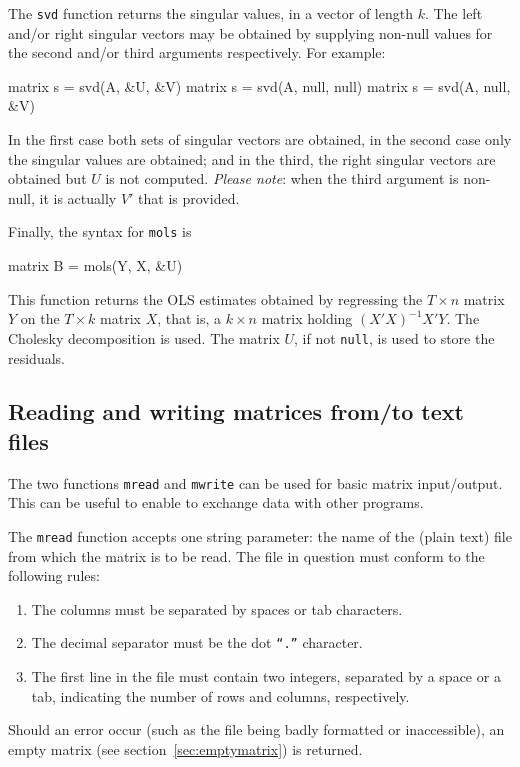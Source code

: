 The \texttt{svd} function returns the singular values, in a vector of
length $k$.  The left and/or right singular vectors may be obtained by
supplying non-null values for the second and/or third arguments
respectively.  For example:
%
\begin{code}
matrix s = svd(A, &U, &V)
matrix s = svd(A, null, null)
matrix s = svd(A, null, &V)
\end{code}
%
In the first case both sets of singular vectors are obtained, in the
second case only the singular values are obtained; and in the third,
the right singular vectors are obtained but $U$ is not computed.
\emph{Please note}: when the third argument is non-null, it is
actually $V'$ that is provided.

Finally, the syntax for \texttt{mols} is
%
\begin{code}
matrix B = mols(Y, X, &U)
\end{code}
%
This function returns the OLS estimates obtained by regressing the $T
\times n$ matrix $Y$ on the $T \times k$ matrix $X$, that is, a $k
\times n$ matrix holding $(X'X)^{-1} X'Y$. The Cholesky decomposition
is used. The matrix $U$, if not \texttt{null}, is used to store the
residuals.

\subsection{Reading and writing matrices from/to text files}
\label{matrix-csv}

The two functions \texttt{mread} and \texttt{mwrite} can be used for
basic matrix input/output. This can be useful to enable  to
exchange data with other programs.

The \texttt{mread} function accepts one string parameter: the name of
the (plain text) file from which the matrix is to be read.  The file
in question must conform to the following rules:
%
\begin{enumerate}
\item The columns must be separated by spaces or tab characters.
\item The decimal separator must be the dot \texttt{``.''} character.
\item The first line in the file must contain two integers, separated
  by a space or a tab, indicating the number of rows and columns,
  respectively.
\end{enumerate}

Should an error occur (such as the file being badly formatted or
inaccessible), an empty matrix (see section~\ref{sec:emptymatrix}) is
returned.

